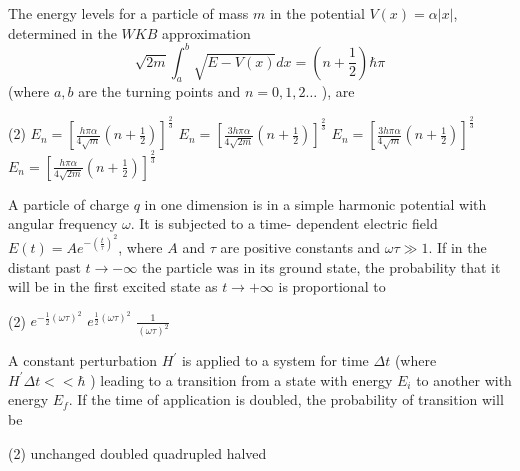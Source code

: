\begin{enumerate}
\begin{minipage}{\textwidth}
	\item The energy levels for a particle of mass $m$ in the potential $V(x)=\alpha|x|$, determined in the $W K B$ approximation
	$$
	\sqrt{2 m} \int_{a}^{b} \sqrt{E-V(x)} d x=\left(n+\frac{1}{2}\right) \hbar \pi
	$$
	(where $a, b$ are the turning points and $n=0,1,2 \ldots$ ), are
\end{minipage}
\begin{tasks}(2)
	\task[\textbf{A.}] $E_{n}=\left[\frac{h \pi \alpha}{4 \sqrt{m}}\left(n+\frac{1}{2}\right)\right]^{\frac{2}{3}}$
	\task[\textbf{B.}]$E_{n}=\left[\frac{3 h \pi \alpha}{4 \sqrt{2 m}}\left(n+\frac{1}{2}\right)\right]^{\frac{2}{3}}$
	\task[\textbf{C.}]$E_{n}=\left[\frac{3 h \pi \alpha}{4 \sqrt{m}}\left(n+\frac{1}{2}\right)\right]^{\frac{2}{3}}$
	\task[\textbf{D.}] $E_{n}=\left[\frac{h \pi \alpha}{4 \sqrt{2 m}}\left(n+\frac{1}{2}\right)\right]^{\frac{2}{3}}$
\end{tasks}
\begin{minipage}{\textwidth}
	\item A particle of charge $q$ in one dimension is in a simple harmonic potential with angular frequency $\omega$. It is subjected to a time- dependent electric field $E(t)=A e^{-\left(\frac{t}{\tau}\right)^{2}}$, where $A$ and $\tau$ are positive constants and $\omega \tau \gg 1$. If in the distant past $t \rightarrow-\infty$ the particle was in its ground state, the probability that it will be in the first excited state as $t \rightarrow+\infty$ is proportional to
\end{minipage}
\begin{tasks}(2)
	\task[\textbf{A.}] $e^{-\frac{1}{2}(\omega \tau)^{2}}$
	\task[\textbf{B.}]$e^{\frac{1}{2}(\omega \tau)^{2}}$
	\task[\textbf{D.}]$\frac{1}{(\omega \tau)^{2}}$
\end{tasks}
\begin{minipage}{\textwidth}
	\item A constant perturbation $H^{\prime}$ is applied to a system for time $\Delta t$ (where $H^{\prime} \Delta t<<\hbar$ ) leading to a transition from a state with energy $E_{i}$ to another with energy $E_{f}$. If the time of application is doubled, the probability of transition will be
\end{minipage}
\begin{tasks}(2)
	\task[\textbf{A.}] unchanged
	\task[\textbf{B.}]doubled
	\task[\textbf{C.}]quadrupled
	\task[\textbf{D.}]halved
\end{tasks}

\end{enumerate}

